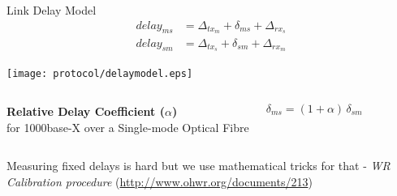 \documentclass[compress,red]{beamer}
\begin{document}
\begin{frame}{Link Delay Model}
 \begin{align}
   \nonumber delay_{ms} &= \Delta_{tx_m} + \delta_{ms} + \Delta_{rx_s} \\
   \nonumber delay_{sm} &= \Delta_{tx_s} + \delta_{sm} + \Delta_{rx_m}
 \end{align}

  \vspace{0.2cm}

 \begin{center}
 \texttt{[image: protocol/delaymodel.eps]}
 \end{center}

  {
 \begin{columns}[c]
   \column{2.8in}
 
     \begin{center}
       \textbf{Relative Delay Coefficient ($\alpha$)} \\
       for 1000base-X over a Single-mode Optical Fibre
     \end{center}
 
   \column{1.5in}
     \begin{center}
       \begin{equation}
       \nonumber \delta_{ms} = (1 + \alpha) \, \delta_{sm}
       \end{equation}
     \end{center}
     \vspace{0.5cm}
 \end{columns}}

  {
 \begin{block}{Measuring fixed delays is hard}
 	but we use mathematical tricks for that - \emph{WR Calibration procedure} (\url{http://www.ohwr.org/documents/213})
 \end{block}}

\end{frame}
\end{document}
